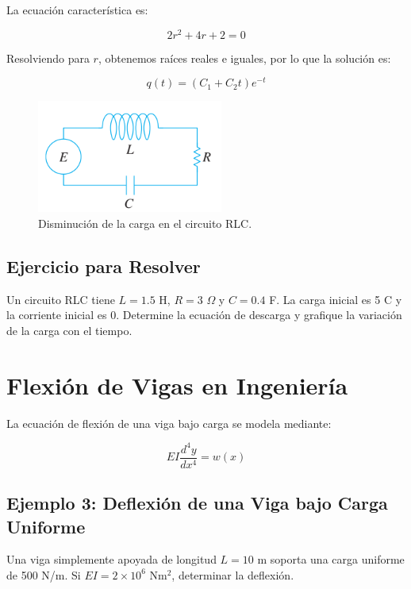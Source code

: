 La ecuación característica es:

\begin{equation}
2r^2 + 4r + 2 = 0
\end{equation}

Resolviendo para \( r \), obtenemos raíces reales e iguales, por lo que la solución es:

\begin{equation}
q(t) = (C_1 + C_2 t) e^{-t}
\end{equation}

\begin{figure}[H]
    \centering
    \includegraphics[width=0.5\linewidth]{images/Modelado 07.png}
    \caption{Disminución de la carga en el circuito RLC.}
    \label{fig:enter-label}
\end{figure}


\subsection*{Ejercicio para Resolver}
Un circuito RLC tiene \( L = 1.5 \) H, \( R = 3 \) \( \Omega \) y \( C = 0.4 \) F. La carga inicial es 5 C y la corriente inicial es 0. Determine la ecuación de descarga y grafique la variación de la carga con el tiempo.

\section{Flexión de Vigas en Ingeniería}
La ecuación de flexión de una viga bajo carga se modela mediante:

\begin{equation}
EI \frac{d^4 y}{dx^4} = w(x)
\end{equation}

\subsection*{Ejemplo 3: Deflexión de una Viga bajo Carga Uniforme}
Una viga simplemente apoyada de longitud \( L = 10 \) m soporta una carga uniforme de 500 N/m. Si \( EI = 2 \times 10^6 \) Nm\(^2\), determinar la deflexión.


